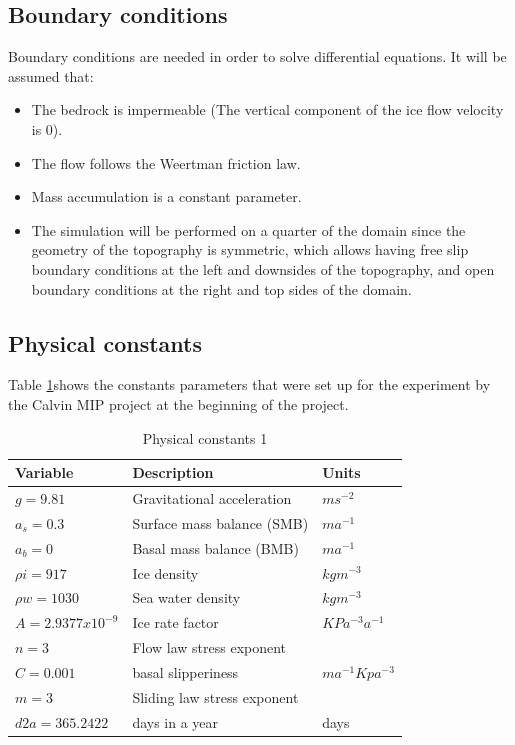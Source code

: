 \documentclass{article}
\begin{document}
\subsection{Boundary conditions}
Boundary conditions are needed in order to solve differential equations. It will be assumed that:
\begin{itemize}
	\item The bedrock is impermeable (The vertical component of the ice flow velocity is 0). 
	\item The flow follows the Weertman friction law.
	\item Mass accumulation is a constant parameter.
	\item The simulation will be performed on a quarter of the domain since the geometry of the topography is symmetric, which allows having free slip boundary conditions at the left and downsides of the topography, and open boundary conditions at the right and top sides of the domain. 
\end{itemize}
\subsection{Physical constants}
Table \ref{Physical constants 1}shows the constants parameters that were set up for the experiment by the Calvin MIP project at the beginning of the project. 
\begin{table}[!h]
	\begin{center}
		\caption{Physical constants 1}
		\label{Physical constants 1}
		\begin{tabular}{|l|l|l|}
			\hline
			Variable          & Description                 & Units           \\ \hline
			$g=9.81$         & Gravitational acceleration  & $ms^{-2}$         \\ \hline
			$a_s=0.3$       & Surface mass balance (SMB)  & $ma^{-1}$         \\ \hline
			$a_b=0$             & Basal mass balance (BMB)    & $ma^{-1}$         \\ \hline
			$\rho i=917$        & Ice density                 & $kg m^{-3}$       \\ \hline
			$\rho w=1030$      & Sea water density           & $kg m^{-3}$       \\ \hline
			$A= 2.9377x10^{-9}$ & Ice rate factor             & $KPa^{-3}a^{-1}$  \\ \hline
			$n=3$               & Flow law stress exponent    &                 \\ \hline
			$C=0.001$           & basal slipperiness          & $ma^{-1}Kpa^{-3}$ \\ \hline
			$m=3$               & Sliding law stress exponent &                 \\ \hline
			$d2a=365.2422$     & days in a year           & days         \\ \hline
		\end{tabular}
	\end{center}
\end{table}
\end{document}
